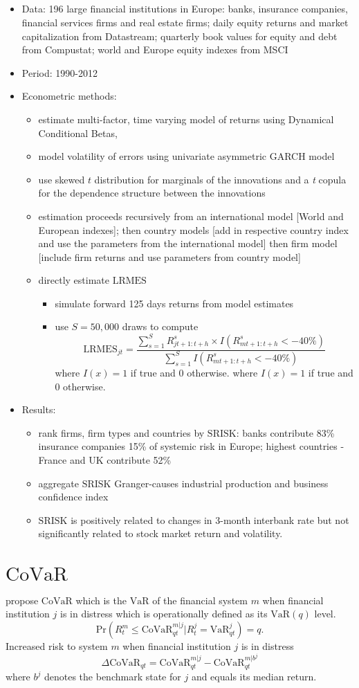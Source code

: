 \documentclass[authoryear]{elsarticle}
\newcommand{\bi}{\begin{itemize}}
\newcommand{\ei}{\end{itemize}}
\renewcommand{\i}{\item}
\newcommand{\sr}{\ensuremath{\mathrm{SRISK}}}
\newcommand{\var}{\ensuremath{\mathrm{VaR}}}
\newcommand{\covar}{\ensuremath{\mathrm{CoVaR}}}
\newcommand{\lmes}{\ensuremath{\mathrm{LRMES}}}
\begin{document}
\subsection{\cite{Engle2014}}
\bi
\i Data: 196 large financial institutions in Europe: banks, insurance companies, financial services firms and real estate firms; daily equity returns and market capitalization from Datastream; quarterly book values for equity and debt from Compustat; world and Europe equity indexes from MSCI
\i Period: 1990-2012 
\i Econometric methods:  
\bi
\i estimate multi-factor, time varying model of returns using Dynamical Conditional Betas,
\cite{Engle2014dcb}
\i model volatility of errors using univariate asymmetric GARCH model
\i use skewed $t$ distribution for marginals of the innovations and a \textit{t} copula for the dependence structure between the innovations
\i estimation proceeds recursively from an international model [World and European indexes]; then country models [add in respective country index and use the parameters from the international model] then firm model [include firm returns and use parameters from country model]  
\i directly estimate $\lmes$
\bi
\i simulate forward 125 days returns from model estimates
\i use $S=50,000$ draws to compute
$$\lmes_{jt}=\frac{\sum_{s=1}^{S}R_{jt+1:t+h}^{s} \times I(R_{mt+1:t+h}^{s} < -40\%)}{\sum_{s=1}^{S}I(R_{mt+1:t+h}^{s}<-40\%)}$$
where $I(x)=1$ if true and 0 otherwise.
where $I(x)=1$ if true and 0 otherwise.
\ei 
\ei 

\i Results:
\bi
\i rank firms, firm types and countries by $\sr$: banks contribute 83\% insurance companies 15\% of systemic risk in Europe; highest countries - France and UK contribute 52\%
\i aggregate $\sr$ Granger-causes industrial production and business confidence index
\i $\sr$ is positively related to changes in 3-month interbank rate but not significantly related to stock market return and volatility.
\ei
\ei





\section{$\covar$}

\cite{adrian2011} propose $\covar$ which is the $\var$ of the financial system $m$ when financial institution $j$ is in distress which is operationally defined as its $\var(q)$ level. 
$$\text{Pr}(R_t^m\leq\covar_{qt}^{m|j}|R_t^j=\var_{qt}^j)=q.$$
Increased risk to system $m$ when financial institution $j$ is in distress 
$$\Delta \covar_{qt}=\covar_{qt}^{m|j}-\covar_{qt}^{m|b^j}$$ 
where $b^j$ denotes the benchmark state for $j$ and equals its median return.
\end{document}
